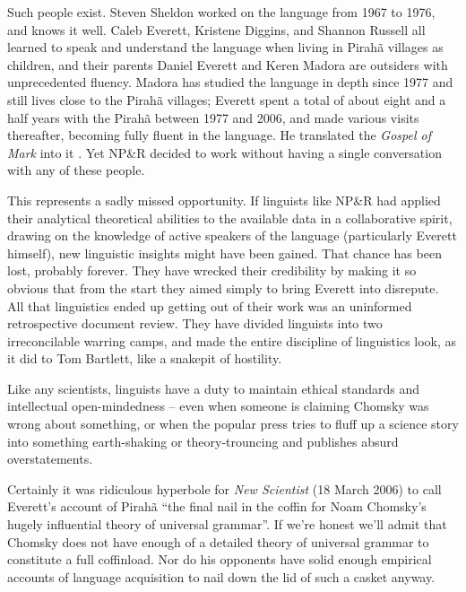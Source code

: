 \documentclass[output=paper,colorlinks,citecolor=brown
]{langscibook}
\begin{document}
\begin{sloppypar}
Such people exist. Steven Sheldon worked on the language from
1967 to 1976, and knows it well. Caleb Everett, Kristene Diggins,
and Shannon Russell all learned to speak and understand the language
when living in Pirah{\~a} villages as children, and their parents
Daniel Everett and Keren Madora are outsiders with unprecedented
fluency. Madora has studied the language in depth since 1977 and
still lives close to the Pirah{\~a} villages; Everett spent a total
of about eight and a half years with the Pirah{\~a} between 1977
and 2006, and made various visits thereafter, becoming fully fluent
in the language. He translated the \textit{Gospel of Mark} into it
\citep{Everett86Mark}. Yet NP\&R decided to work without having a
single conversation with any of these people.
\end{sloppypar}

This represents a sadly missed opportunity. If linguists like NP\&R
had applied their analytical theoretical abilities to the available
data in a collaborative spirit, drawing on the knowledge of active
speakers of the language (particularly Everett himself), new linguistic
insights might have been gained. That chance has been lost, probably
forever. They have wrecked their credibility by making it so obvious
that from the start they aimed simply to bring Everett into disrepute.
All that linguistics ended up getting out of their work was an
uninformed retrospective document review. They have divided linguists
into two irreconcilable warring camps, and made the entire discipline
of linguistics look, as it did to Tom Bartlett, like a snakepit of
hostility.

Like any scientists, linguists have a duty to maintain ethical
standards and intellectual open-mindedness -- even when someone is
claiming Chomsky was wrong about something, or when the popular
press tries to fluff up a science story into something earth-shaking
or theory-trouncing and publishes absurd overstatements.

Certainly it was ridiculous hyperbole for
\textit{New Scientist} (18 March 2006)
to call Everett's account of Pirah{\~a} ``the final nail in the
coffin for Noam Chomsky's hugely influential theory of universal
grammar''. If we're honest we'll admit that Chomsky does not have
enough of a detailed theory of universal grammar to constitute a full
coffinload. Nor do his opponents have solid enough empirical accounts
of language acquisition to nail down the lid of such a casket anyway.
\end{document}
